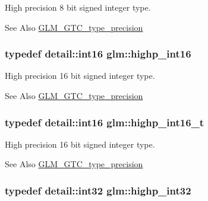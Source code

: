 High precision 8 bit signed integer type. \begin{DoxySeeAlso}{See Also}
\hyperlink{group__gtc__type__precision}{G\-L\-M\-\_\-\-G\-T\-C\-\_\-type\-\_\-precision} 
\end{DoxySeeAlso}
\hypertarget{group__gtc__type__precision_gaf0430ed80e88c0d1dfbe47f359659c81}{
\subsubsection[{highp\-\_\-int16}]{\setlength{\rightskip}{0pt plus 5cm}typedef detail\-::int16 {\bf glm\-::highp\-\_\-int16}}}\label{group__gtc__type__precision_gaf0430ed80e88c0d1dfbe47f359659c81}
High precision 16 bit signed integer type. \begin{DoxySeeAlso}{See Also}
\hyperlink{group__gtc__type__precision}{G\-L\-M\-\_\-\-G\-T\-C\-\_\-type\-\_\-precision} 
\end{DoxySeeAlso}
\hypertarget{group__gtc__type__precision_ga07d318d61472e75238e53b9642227672}{
\subsubsection[{highp\-\_\-int16\-\_\-t}]{\setlength{\rightskip}{0pt plus 5cm}typedef detail\-::int16 {\bf glm\-::highp\-\_\-int16\-\_\-t}}}\label{group__gtc__type__precision_ga07d318d61472e75238e53b9642227672}
High precision 16 bit signed integer type. \begin{DoxySeeAlso}{See Also}
\hyperlink{group__gtc__type__precision}{G\-L\-M\-\_\-\-G\-T\-C\-\_\-type\-\_\-precision} 
\end{DoxySeeAlso}
\hypertarget{group__gtc__type__precision_gaa2045c92b9553d463191af6a20e997bb}{
\subsubsection[{highp\-\_\-int32}]{\setlength{\rightskip}{0pt plus 5cm}typedef detail\-::int32 {\bf glm\-::highp\-\_\-int32}}}\label{group__gtc__type__precision_gaa2045c92b9553d463191af6a20e997bb}
